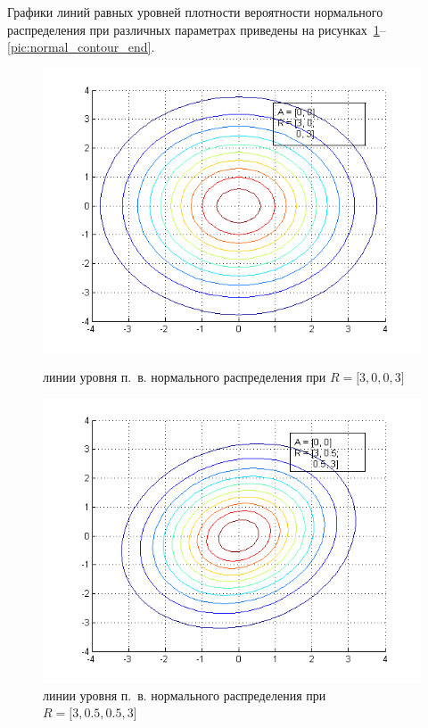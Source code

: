 \newpage

Графики линий равных уровней плотности вероятности нормального распределения при различных
параметрах приведены на рисунках~\ref{pic:normal_contour_start}--\ref{pic:normal_contour_end}.

\begin{figure}[h!]
  \begin{minipage}[h!]{0.47\linewidth}
    \includegraphics[width=1\linewidth]{pic/new/normal_contour_1}
    \caption{линии уровня п.~в.
      нормального распределения при $ R = \big[3, 0, 0, 3 \big] $}
    \label{pic:normal_contour_start}
  \end{minipage}
  \hfill
  \begin{minipage}[h!]{0.47\linewidth}
    \vspace{4mm}
    \includegraphics[width=1\linewidth]{pic/new/normal_contour_2}
    \caption{линии уровня п.~в.
      нормального распределения при $ R = \big[3, 0.5, 0.5, 3 \big] $}
  \end{minipage}
\end{figure}

